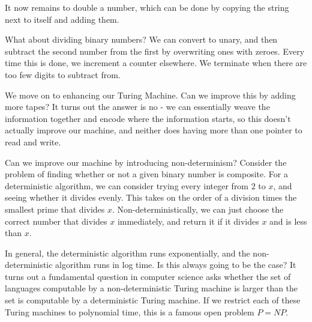 \documentclass[11pt,twosided]{article}
\begin{document}
It now remains to double a number, which can be done by copying the string next to itself and adding them. 

What about dividing binary numbers? We can convert to unary, and then subtract the second number from the first by overwriting ones with zeroes. Every time this is done, we increment a counter elsewhere. We terminate when there are too few digits to subtract from. 

We move on to enhancing our Turing Machine. Can we improve this by adding more tapes? It turns out the answer is no - we can essentially weave the information together and encode where the information starts, so this doesn't actually improve our machine, and neither does having more than one pointer to read and write. 

Can we improve our machine by introducing non-determinism? Consider the problem of finding whether or not a given binary number is composite. For a deterministic algorithm, we can consider trying every integer from $2$ to $x$, and seeing whether it divides evenly. This takes on the order of a division times the smallest prime that divides $x$. Non-deterministically, we can just choose the correct number that divides $x$ immediately, and return it if it divides $x$ and is less than $x$. 

In general, the deterministic algorithm runs exponentially, and the non-deterministic algorithm runs in log time. Is this always going to be the case? It turns out a fundamental question in computer science asks whether the set of languages computable by a non-deterministic Turing machine is larger than the set is computable by a deterministic Turing machine. If we restrict each of these Turing machines to polynomial time, this is a famous open problem $P = NP$. 
\end{document}
